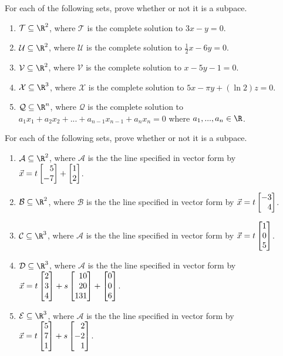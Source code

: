\begin{exercises}
	\begin{problist}

		\prob For each of the following sets, prove whether or not it is a subpace.
		\begin{enumerate}
			\item  $\mathcal T \subseteq \R^2$, where $\mathcal T$ is the complete solution to $3x-y=0$.
			\item  $\mathcal U \subseteq \R^2$, where $\mathcal U$ is the complete solution to $\frac{1}{2}x-6y=0$.
			\item  $\mathcal V \subseteq \R^2$, where $\mathcal V$ is the complete solution to $x-5y-1=0$.
			\item  $\mathcal X \subseteq \R^3$, where $\mathcal X$ is the complete solution to
			$5x-\pi y + (\ln 2)z=0$.
			\item $\mathcal Q \subseteq \R^n$, where $\mathcal Q$ is the complete solution to
			$a_1x_1+a_2x_2+...+a_{n-1}x_{n-1}+a_nx_n=0$ where $a_1,...,a_n \in \R$.
		\end{enumerate}

		\prob For each of the following sets, prove whether or not it is a subpace.
		\begin{enumerate}
			\item $\mathcal A \subseteq \R^2$, where $\mathcal A$ is the the line specified in vector form by
			$\vec x = t\mat{5\\-7}+\mat{1\\2}$.
			\item $\mathcal B \subseteq \R^2$, where $\mathcal B$ is  the the line specified  in vector form by
			$\vec x = t\mat{-3\\4}$.
			\item $\mathcal C \subseteq \R^3$, where $\mathcal A$ is  the the line specified  in vector form by
			$\vec x = t\mat{1\\0\\5}$.
			\item $\mathcal D \subseteq \R^3$, where $\mathcal A$ is  the the line specified  in vector form by
			$\vec x = t\mat{2\\3\\4}+s\mat{10\\20\\131}+\mat{0\\0\\6}$.
			\item $\mathcal E \subseteq \R^3$, where $\mathcal A$ is  the the line specified  in vector form by
			$\vec x = t\mat{5\\7\\1}+s\mat{2\\-2\\1}$.
		\end{enumerate}


\end{problist}
\end{exercises}
